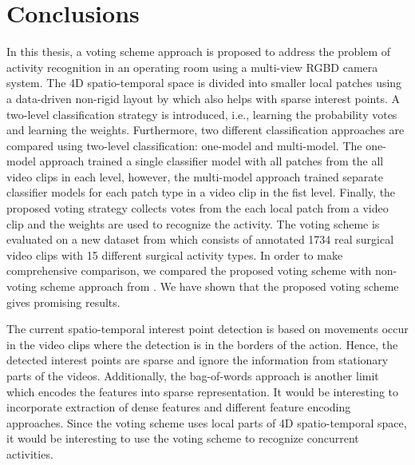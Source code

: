 
\chapter{Conclusions} %
\label{Chapter5} %

\label{section:Conclusions}
	In this thesis, a voting scheme approach is proposed to address the problem of activity recognition in an operating room using a multi-view RGBD camera system. The 4D spatio-temporal space is divided into smaller local patches using a data-driven non-rigid layout by \cite{twinanda2015data} which also helps with sparse interest points. A two-level classification strategy is introduced, i.e., learning the probability votes and learning the weights. Furthermore, two different classification approaches are compared using two-level classification: one-model and multi-model. The one-model approach trained a single classifier model with all patches from the all video clips in each level, however, the multi-model approach trained separate classifier models for  each patch type in a video clip in the fist level. Finally, the proposed voting strategy collects votes from the each local patch from a video clip and the weights are used to recognize the activity. The voting scheme is evaluated on a new dataset from \cite{twinanda2015data} which consists of annotated 1734 real surgical video clips with 15 different surgical activity types. In order to make comprehensive comparison, we compared the proposed voting scheme with non-voting scheme approach from \cite{twinanda2015data}. We have shown that the proposed voting scheme gives promising results. 
    
    The current spatio-temporal interest point detection is based on movements occur in the video clips where the detection is in the borders of the action. Hence, the detected interest points are sparse and ignore the information from stationary parts of the videos. Additionally, the bag-of-words approach is another limit which encodes the features into sparse representation. It would be interesting to incorporate extraction of dense features and different feature encoding approaches. Since the voting scheme uses local parts of 4D spatio-temporal space, it would be interesting to use the voting scheme to recognize concurrent activities.
    
